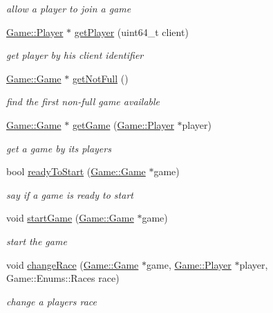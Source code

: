 \begin{DoxyCompactItemize}
\begin{DoxyCompactList}\small\item\em allow a player to join a game \end{DoxyCompactList}\item 
\hyperlink{class_game_1_1_player}{Game\+::\+Player} $\ast$ \hyperlink{class_server_side_a2efe0b51ba110d415b3aa5bad8000bbb}{get\+Player} (uint64\+\_\+t client)
\begin{DoxyCompactList}\small\item\em get player by his client identifier \end{DoxyCompactList}\item 
\hyperlink{class_game_1_1_game}{Game\+::\+Game} $\ast$ \hyperlink{class_server_side_a014324eeffcf272ed539027e4c2df34b}{get\+Not\+Full} ()
\begin{DoxyCompactList}\small\item\em find the first non-\/full game available \end{DoxyCompactList}\item 
\hyperlink{class_game_1_1_game}{Game\+::\+Game} $\ast$ \hyperlink{class_server_side_a69f08b4f34448c386d9d204ba8e9ca51}{get\+Game} (\hyperlink{class_game_1_1_player}{Game\+::\+Player} $\ast$player)
\begin{DoxyCompactList}\small\item\em get a game by its players \end{DoxyCompactList}\item 
bool \hyperlink{class_server_side_a9a826521b535f8fcc33c89cebc099442}{ready\+To\+Start} (\hyperlink{class_game_1_1_game}{Game\+::\+Game} $\ast$game)
\begin{DoxyCompactList}\small\item\em say if a game is ready to start \end{DoxyCompactList}\item 
void \hyperlink{class_server_side_a88f8b282da2d8eb4175ba9f591198470}{start\+Game} (\hyperlink{class_game_1_1_game}{Game\+::\+Game} $\ast$game)
\begin{DoxyCompactList}\small\item\em start the game \end{DoxyCompactList}\item 
void \hyperlink{class_server_side_a35e324591b42afc0ff67323c5e6bb271}{change\+Race} (\hyperlink{class_game_1_1_game}{Game\+::\+Game} $\ast$game, \hyperlink{class_game_1_1_player}{Game\+::\+Player} $\ast$player, Game\+::\+Enums\+::\+Races race)
\begin{DoxyCompactList}\small\item\em change a player\textquotesingle{}s race \end{DoxyCompactList}\item 

\end{DoxyCompactItemize}
